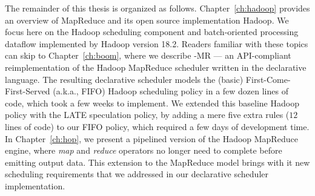 The remainder of this thesis is organized as follows.  Chapter~\ref{ch:hadoop}
provides an overview of MapReduce and its open source implementation Hadoop.
We focus here on the Hadoop scheduling component and batch-oriented processing
dataflow implemented by Hadoop version 18.2.  Readers familiar with these
topics can skip to Chapter~\ref{ch:boom}, where we describe \BOOM-MR --- an
API-compliant reimplementation of the Hadoop MapReduce scheduler written in the
\OVERLOG declarative language.  The resulting declarative scheduler models the
(basic) First-Come-First-Served (a.k.a., FIFO) Hadoop scheduling policy in a
few dozen lines of code, which took a few weeks to implement.  We extended this
baseline Hadoop policy with the LATE speculation policy, by adding a mere five
extra rules ($12$ lines of code) to our FIFO policy, which required a few days
of development time.  In Chapter~\ref{ch:hop}, we present a pipelined version
of the Hadoop MapReduce engine, where {\em map} and {\em reduce} operators no
longer need to complete before emitting output data.  This extension to the
MapReduce model brings with it new scheduling requirements that we addressed in
our declarative scheduler implementation.

